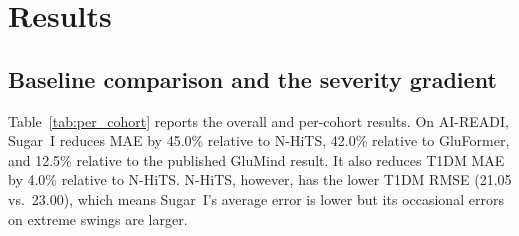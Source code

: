 \documentclass[11pt,a4paper]{article}
\begin{document}
\section{Results}

\subsection{Baseline comparison and the severity gradient}

Table~\ref{tab:per_cohort} reports the overall and per-cohort results.
On AI-READI, Sugar~I reduces MAE by 45.0\% relative to N-HiTS, 42.0\% relative to GluFormer, and 12.5\% relative to the published GluMind result.
It also reduces T1DM MAE by 4.0\% relative to N-HiTS.
N-HiTS, however, has the lower T1DM RMSE (21.05 vs.\ 23.00), which means Sugar~I's average error is lower but its occasional errors on extreme swings are larger.

\begin{table}[h]
\centering
\caption{Overall and per-cohort results for 60-minute prediction (MAE in mg/dL unless noted). The AI-READI columns cover four T2DM-spectrum cohorts (896 participants); the per-cohort columns use the combined AI-READI + T1DM benchmark. $^{\ddagger}$Sugar~I's T1DM result comes from a T1DM-only evaluation, whereas the baseline results come from the combined benchmark, so this column compares different test sets.}
\label{tab:per_cohort}
\small
{}
\end{table}
\end{document}
